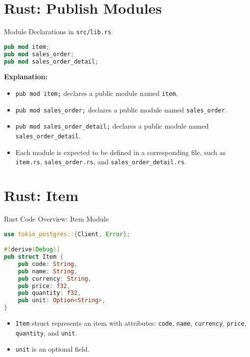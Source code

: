 \documentclass[aspectratio=169, table]{beamer}
\begin{document}
\section{Rust: Publish Modules}
\begin{frame}[fragile]{Module Declarations in \texttt{src/lib.rs}}
\begin{lstlisting}[language=Rust]
pub mod item;
pub mod sales_order;
pub mod sales_order_detail;
\end{lstlisting}

\textbf{Explanation:}
\begin{itemize}
\item \texttt{pub mod item;} declares a public module named \texttt{item}.
\item \texttt{pub mod sales\_order;} declares a public module named \texttt{sales\_order}.
\item \texttt{pub mod sales\_order\_detail;} declares a public module named \texttt{sales\_order\_detail}.
\item Each module is expected to be defined in a corresponding file, such as \texttt{item.rs}, \texttt{sales\_order.rs}, and \texttt{sales\_order\_detail.rs}.
\end{itemize}
\end{frame}


\section{Rust: Item}
\begin{frame}[fragile]{Rust Code Overview: Item Module}
\vspace{15pt}
\begin{lstlisting}[language=Rust]
use tokio_postgres::{Client, Error};

#[derive(Debug)]
pub struct Item {
	pub code: String,
	pub name: String,
	pub currency: String,
	pub price: f32,
	pub quantity: f32,
	pub unit: Option<String>,
}
\end{lstlisting}

\begin{itemize}
\item \texttt{Item} struct represents an item with attributes: \texttt{code}, \texttt{name}, \texttt{currency}, \texttt{price}, \texttt{quantity}, and \texttt{unit}.
\item \texttt{unit} is an optional field.
\end{itemize}
\end{frame}
\end{document}
